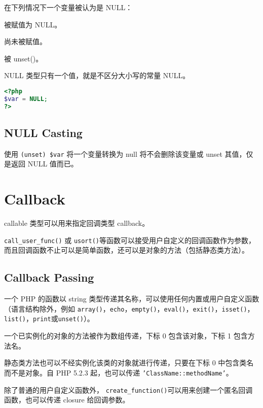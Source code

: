 在下列情况下一个变量被认为是 NULL：

\begin{compactitem}
\item 被赋值为 NULL。
\item 尚未被赋值。
\item 被 unset()。
\end{compactitem}

NULL 类型只有一个值，就是不区分大小写的常量 NULL。

\begin{lstlisting}[language=PHP]
<?php
$var = NULL;       
?>
\end{lstlisting}

\subsection{NULL Casting}

使用 \texttt{(unset) \$var} 将一个变量转换为 null 将不会删除该变量或 unset 其值，仅是返回 NULL 值而已。






\section{Callback}

callable 类型可以用来指定回调类型 callback。


\texttt{call\_user\_func()} 或 \texttt{usort()}等函数可以接受用户自定义的回调函数作为参数，而且回调函数不止可以是简单函数，还可以是对象的方法（包括静态类方法）。


\subsection{Callback Passing}

一个 PHP 的函数以 string 类型传递其名称，可以使用任何内置或用户自定义函数（语言结构除外，例如 \texttt{array()}，\texttt{echo}，\texttt{empty()}，\texttt{eval()}，\texttt{exit()}，\texttt{isset()}，\texttt{list()}，\texttt{print}或\texttt{unset()}）。

一个已实例化的对象的方法被作为数组传递，下标 0 包含该对象，下标 1 包含方法名。

静态类方法也可以不经实例化该类的对象就进行传递，只要在下标 0 中包含类名而不是对象。自 PHP 5.2.3 起，也可以传递 \texttt{'ClassName::methodName'}。

除了普通的用户自定义函数外， \texttt{create\_function()}可以用来创建一个匿名回调函数，也可以传递 closure 给回调参数。

